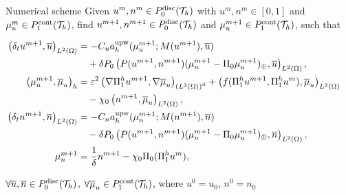 \begin{frame}{Numerical scheme}
	\footnotesize
	Given $u^m,n^m\in\relax{P}^{\text{disc}}_0(\mathcal{T}_h)$ with $u^{m},n^{m}\in[0,1]$ and $\mu_u^m\in\relax{P}^{\text{cont}}_1(\mathcal{T}_h)$, find $u^{m+1}, n^{m+1}\in \relax{P}^{\text{disc}}_0(\mathcal{T}_h)$ and $\mu_u^{m+1} \in \relax{P}^{\text{cont}}_1(\mathcal{T}_h)$, such that
	\begin{block}{}
		\begin{align*}
			\left(\delta_tu^{m+1},\overline{u}\right)_{L^2(\Omega)}&=-C_ua_h^{\text{upw}}(\mu_u^{m+1};M(u^{m+1}),\overline{u})&\notag\\&\quad+\delta P_0\left(P(u^{m+1},n^{m+1})(\mu_n^{m+1}-\Pi_0\mu_u^{m+1})_\oplus ,\overline{u}\right)_{L^2(\Omega)},\\
			\left(\mu_u^{m+1},\overline{\mu}_u\right)_h&=\varepsilon^2 \left(\nabla \Pi_1^h u^{m+1},\nabla\overline{\mu}_u\right)_{\left(L^2(\Omega)\right)^d}+ \left(f(\Pi_1^h u^{m+1},\Pi_1^h u^m),\overline{\mu}_u\right)_{L^2(\Omega)}\nonumber\\&\quad-\chi_0\left( n^{m+1},\overline{\mu}_u\right)_{L^2(\Omega)},\\
			\left(\delta_t n^{m+1},\overline{n}\right)_{L^2(\Omega)}&=-C_na_h^{\text{upw}}(\mu_n^{m+1};M(n^{m+1}),\overline{n})&\notag\\&\quad-\delta P_0 \left(P(u^{m+1},n^{m+1})(\mu_n^{m+1}-\Pi_0\mu_u^{m+1})_\oplus ,\overline{n}\right)_{L^2(\Omega)},\\
			\mu_n^{m+1}&=\frac{1}{\delta}n^{m+1}  -\chi_0 \Pi_0(\Pi_1^h u^{m}),
		\end{align*}
	\end{block}
	$\forall\overline{u},\overline{n}\in\relax{P}^{\text{disc}}_0(\mathcal{T}_h)$, $\forall\overline{\mu}_u\in \relax{P}^{\text{cont}}_1(\mathcal{T}_h)$, where $u^0=u_0$, $n^0=n_0$
\end{frame}


